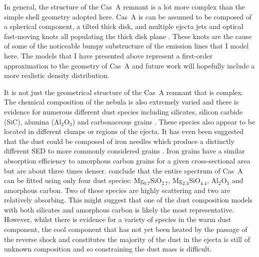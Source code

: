 In general, the structure of the Cas~A remnant is a lot more complex than the simple shell geometry adopted here.  Cas~A is can be assumed to be composed of a spherical component, a tilted thick disk, and multiple ejecta jets and optical fast-moving knots all populating the thick disk plane \citep{DeLaney2010}.  These knots  are the cause of some of the noticeable bumpy substructure of the emission lines that I model here.  The models that I have presented above represent a first-order approximation to the geometry of Cas~A and future work will hopefully include a more realistic density distribution.

It is not just the geometrical structure of the Cas~A remnant that is complex.  The chemical composition of the nebula is also extremely varied and there is evidence for numerous different dust species including silicates, silicon carbide (SiC), alumina (Al$_2$O$_3$) and carbonaceous grains \citep{Arendt2014,Biscaro2014}.  These species also appear to be located in different clumps or regions of the ejecta.  It has even been suggested that the dust could be composed of iron needles which produce a distinctly different SED to more commonly considered grains \citep{Dwek2004}.  Iron grains have a similar absorption efficiency to amorphous carbon grains for a given cross-sectional area but are about three times denser. \citet{Arendt2014} conclude that the entire spectrum of Cas~A can be fitted using only four dust species: Mg$_0.7$SiO$_2.7$, Mg$_2.4$SiO$_4.4$, Al$_2$O$_3$ and amorphous carbon.  Two of these species are highly scattering and two are relatively absorbing.  This might suggest that one of the dust composition models with both silicates and amorphous carbon is likely the most representative.  However, whilst there is evidence for a variety of species in the warm dust component, the cool component that has not yet been heated by the passage of the reverse shock and constitutes the majority of the dust in the ejecta is still of unknown composition \citep{Arendt2014} and so constraining the dust mass is difficult.

